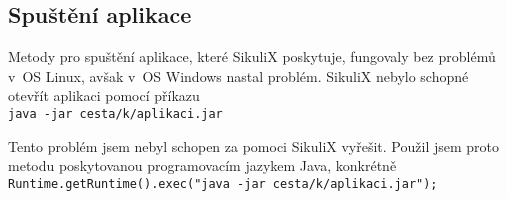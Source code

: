 		\subsection{Spuštění aplikace}
		Metody pro spuštění aplikace, které SikuliX poskytuje, fungovaly bez problémů v~OS Linux, avšak v~OS Windows nastal problém. SikuliX nebylo schopné otevřít aplikaci pomocí příkazu\\
		\texttt{java -jar cesta/k/aplikaci.jar}
		
		Tento problém jsem nebyl schopen za pomoci SikuliX vyřešit. Použil jsem proto metodu poskytovanou programovacím jazykem Java, konkrétně\\
		\texttt{Runtime.getRuntime().exec("java -jar cesta/k/aplikaci.jar");}